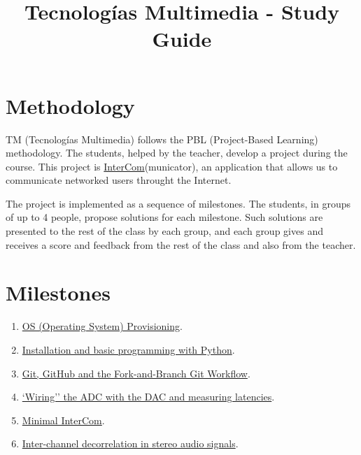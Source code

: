 \title{Tecnologías Multimedia - Study Guide}

\maketitle

\section{Methodology}
TM (Tecnologías Multimedia) follows the PBL (Project-Based Learning) methodology. The students,
helped by the teacher, develop a project during the course. This
project
is \href{https://github.com/Tecnologias-multimedia/intercom}{InterCom}(municator),
an application that allows us to communicate networked users throught
the Internet.

The project is implemented as a sequence of milestones. The students,
in groups of up to 4 people, propose solutions for each
milestone. Such solutions are presented to the rest of the class by
each group, and each group gives and receives a score and feedback
from the rest of the class and also from the teacher.

\section{Milestones}
\begin{enumerate}
\item \href{https://tecnologias-multimedia.github.io/study_guide/milestone00/}{OS (Operating System) Provisioning}.
\item \href{https://tecnologias-multimedia.github.io/study_guide/milestone01/}{Installation and basic programming with Python}.
\item \href{https://tecnologias-multimedia.github.io/study_guide/milestone02/}{Git, GitHub and the Fork-and-Branch Git Workflow}.
\item \href{https://tecnologias-multimedia.github.io/study_guide/milestone03/}{`Wiring'' the ADC with the DAC and measuring latencies}.
\item \href{https://tecnologias-multimedia.github.io/study_guide/milestone04/}{Minimal InterCom}.
\item \href{https://tecnologias-multimedia.github.io/study_guide/milestone05/}{Inter-channel decorrelation in stereo audio signals}.
\end{enumerate}

